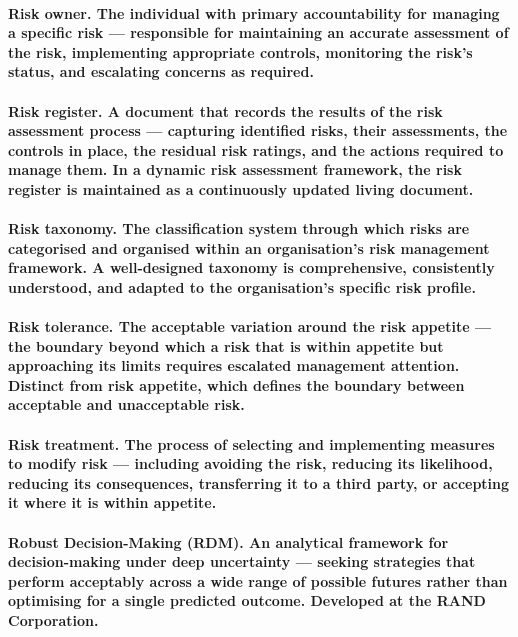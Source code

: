 \paragraph{\textbf{Risk owner}. The individual with primary accountability for managing a specific risk — responsible for maintaining an accurate assessment of the risk, implementing appropriate controls, monitoring the risk's status, and escalating concerns as required.}

\paragraph{\textbf{Risk register}. A document that records the results of the risk assessment process — capturing identified risks, their assessments, the controls in place, the residual risk ratings, and the actions required to manage them. In a dynamic risk assessment framework, the risk register is maintained as a continuously updated living document.}

\paragraph{\textbf{Risk taxonomy}. The classification system through which risks are categorised and organised within an organisation's risk management framework. A well-designed taxonomy is comprehensive, consistently understood, and adapted to the organisation's specific risk profile.}

\paragraph{\textbf{Risk tolerance}. The acceptable variation around the risk appetite — the boundary beyond which a risk that is within appetite but approaching its limits requires escalated management attention. Distinct from risk appetite, which defines the boundary between acceptable and unacceptable risk.}

\paragraph{\textbf{Risk treatment}. The process of selecting and implementing measures to modify risk — including avoiding the risk, reducing its likelihood, reducing its consequences, transferring it to a third party, or accepting it where it is within appetite.}

\paragraph{\textbf{Robust Decision-Making (RDM)}. An analytical framework for decision-making under deep uncertainty — seeking strategies that perform acceptably across a wide range of possible futures rather than optimising for a single predicted outcome. Developed at the RAND Corporation.}

